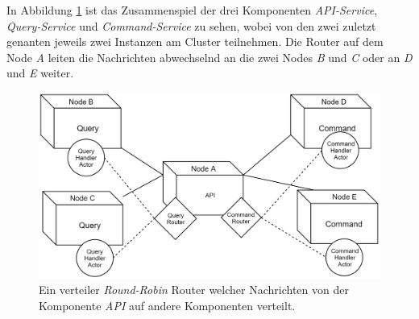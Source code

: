 In Abbildung \ref{fig:implementation:routing} ist das Zusammenspiel der drei Komponenten \textit{API-Service}, \textit{Query-Service} und \textit{Command-Service} zu sehen, wobei von den zwei zuletzt genanten jeweils zwei Instanzen am Cluster teilnehmen. Die Router auf dem Node \textit{A} leiten die Nachrichten abwechselnd an die zwei Nodes \textit{B} und \textit{C} oder an \textit{D} und \textit{E} weiter. 

\begin{figure}
    \centering
    \includegraphics[width=\linewidth]{gfx/implementation/ClusterRouter}
    \caption{Ein verteiler \textit{Round-Robin} Router welcher Nachrichten von der Komponente \textit{API} auf andere Komponenten verteilt.}
    \label{fig:implementation:routing}
\end{figure} 

